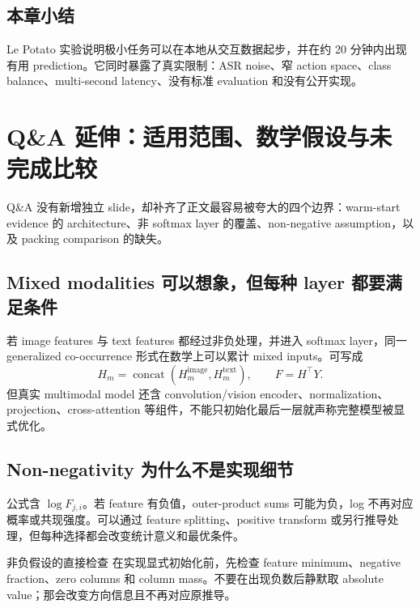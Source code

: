 \documentclass[a4paper]{article}
\begin{document}

\subsection{本章小结}

Le Potato 实验说明极小任务可以在本地从交互数据起步，并在约 20 分钟内出现有用 prediction。它同时暴露了真实限制：ASR noise、窄 action space、class balance、multi-second latency、没有标准 evaluation 和没有公开实现。

\section{Q\&A 延伸：适用范围、数学假设与未完成比较}

Q\&A 没有新增独立 slide，却补齐了正文最容易被夸大的四个边界：warm-start evidence 的 architecture、非 softmax layer 的覆盖、non-negative assumption，以及 packing comparison 的缺失。

\subsection{Mixed modalities 可以想象，但每种 layer 都要满足条件}

若 image features 与 text features 都经过非负处理，并进入 softmax layer，同一 generalized co-occurrence 形式在数学上可以累计 mixed inputs。可写成
\[
H_m=\operatorname{concat}(H_m^{\text{image}},H_m^{\text{text}}),
\qquad F=H^\top Y.
\]
但真实 multimodal model 还含 convolution/vision encoder、normalization、projection、cross-attention 等组件，不能只初始化最后一层就声称完整模型被显式优化。


\subsection{Non-negativity 为什么不是实现细节}

公式含 $\log F_{j,i}$。若 feature 有负值，outer-product sums 可能为负，log 不再对应概率或共现强度。可以通过 feature splitting、positive transform 或另行推导处理，但每种选择都会改变统计意义和最优条件。

\begin{importantbox}{非负假设的直接检查}
在实现显式初始化前，先检查 feature minimum、negative fraction、zero columns 和 column mass。不要在出现负数后静默取 absolute value；那会改变方向信息且不再对应原推导。
\end{importantbox}
\end{document}
